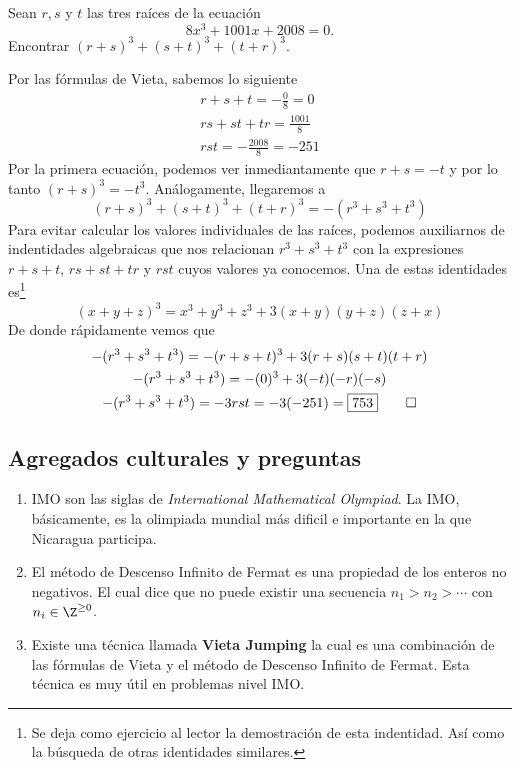 \begin{section-example.tcb}[2008 AIME II \#7]
    Sean $r, s$ y $t$ las tres raíces de la ecuación
    \[8x^3 + 1001x + 2008 = 0.\]
    Encontrar $(r + s)^3 + (s + t)^3 + (t + r)^3.$
\end{section-example.tcb}
\begin{solution}
    Por las fórmulas de Vieta, sabemos lo siguiente
    \begin{gather*}
        r +  s + t = - \frac{0}{8} = 0 \\
        rs +  st + tr = \frac{1001}{8} \\
        r s t = - \frac{2008}{8} = -251
    \end{gather*}
    Por la primera ecuación, podemos ver inmediantamente que $r + s = -t$ y por lo tanto $(r + s)^3 = - t^3$.
    Análogamente, llegaremos a
    \[(r + s)^3 + (s + t)^3 + (t + r)^3 =  -(r^3 + s^3 + t^3)\]
    Para evitar calcular los valores individuales de las raíces, podemos auxiliarnos de indentidades algebraicas
    que nos relacionan $r^3 + s^3 + t^3$ con la expresiones $r +  s + t$, $rs +  st + tr$ y $rst$ cuyos valores ya conocemos.
    Una de estas identidades es\footnote{Se deja como ejercicio al lector la demostración de esta indentidad. Así como la búsqueda de otras identidades similares.}
    \[(x + y + z)^3 = x^3 + y^3 + z^3 + 3(x + y)(y + z)(z + x)\]
    De donde rápidamente vemos que
    \begin{gather*}
        -(r^3 + s^3 + t^3) = - (r + s + t)^3 + 3(r + s)(s + t)(t + r)\\
        -(r^3 + s^3 + t^3) = -(0)^3 + 3(-t)(-r)(-s)\\
        -(r^3 + s^3 + t^3) = - 3rst = -3(-251) = \boxed{753} \qedhere
    \end{gather*}
\end{solution}



\subsection{Agregados culturales y preguntas}

\begin{enumerate}
    \item IMO son las siglas de \textit{International Mathematical Olympiad}. La IMO, básicamente, es la olimpiada mundial más dificil e importante en la que Nicaragua participa.
    \item El método de Descenso Infinito de Fermat es una propiedad de los enteros no negativos. El cual dice que no puede existir una secuencia $n_1 > n_2 > \cdots$ con $n_i \in \Z^{\geq 0}$.
    \item Existe una técnica llamada \textbf{Vieta Jumping} la cual es una combinación de las fórmulas de Vieta y el método de Descenso Infinito de Fermat.
    Esta técnica es muy útil en problemas nivel IMO.
\end{enumerate}

